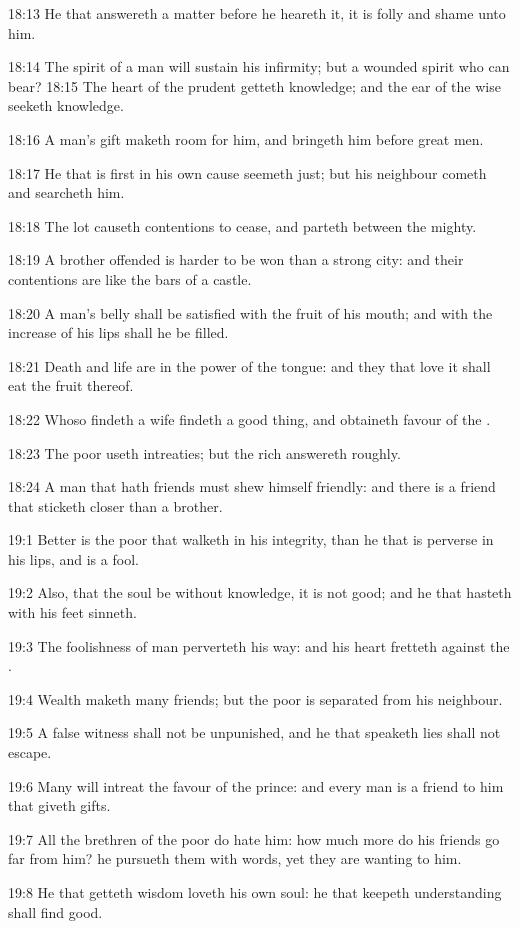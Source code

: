 18:13 He that answereth a matter before he heareth it, it is folly and
shame unto him.

18:14 The spirit of a man will sustain his infirmity; but a wounded
spirit who can bear?  18:15 The heart of the prudent getteth
knowledge; and the ear of the wise seeketh knowledge.

18:16 A man's gift maketh room for him, and bringeth him before great
men.

18:17 He that is first in his own cause seemeth just; but his
neighbour cometh and searcheth him.

18:18 The lot causeth contentions to cease, and parteth between the
mighty.

18:19 A brother offended is harder to be won than a strong city: and
their contentions are like the bars of a castle.

18:20 A man's belly shall be satisfied with the fruit of his mouth;
and with the increase of his lips shall he be filled.

18:21 Death and life are in the power of the tongue: and they that
love it shall eat the fruit thereof.

18:22 Whoso findeth a wife findeth a good thing, and obtaineth favour
of the \LORD.

18:23 The poor useth intreaties; but the rich answereth roughly.

18:24 A man that hath friends must shew himself friendly: and there is
a friend that sticketh closer than a brother.

19:1 Better is the poor that walketh in his integrity, than he that is
perverse in his lips, and is a fool.

19:2 Also, that the soul be without knowledge, it is not good; and he
that hasteth with his feet sinneth.

19:3 The foolishness of man perverteth his way: and his heart fretteth
against the \LORD.

19:4 Wealth maketh many friends; but the poor is separated from his
neighbour.

19:5 A false witness shall not be unpunished, and he that speaketh
lies shall not escape.

19:6 Many will intreat the favour of the prince: and every man is a
friend to him that giveth gifts.

19:7 All the brethren of the poor do hate him: how much more do his
friends go far from him? he pursueth them with words, yet they are
wanting to him.

19:8 He that getteth wisdom loveth his own soul: he that keepeth
understanding shall find good.

